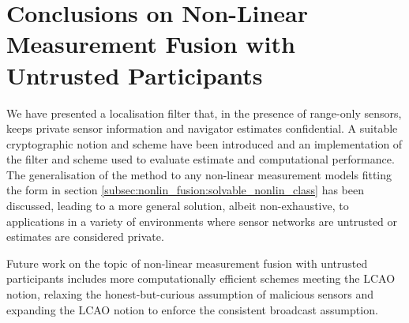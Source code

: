 % 
%                                               
%                                               
%                                               
% 

\section{Conclusions on Non-Linear Measurement Fusion with Untrusted Participants}\label{sec:nonlin_fusion:conclusion}
We have presented a localisation filter that, in the presence of range-only sensors, keeps private sensor information and navigator estimates confidential. A suitable cryptographic notion and scheme have been introduced and an implementation of the filter and scheme used to evaluate estimate and computational performance. The generalisation of the method to any non-linear measurement models fitting the form in section \ref{subsec:nonlin_fusion:solvable_nonlin_class} has been discussed, leading to a more general solution, albeit non-exhaustive, to applications in a variety of environments where sensor networks are untrusted or estimates are considered private.

Future work on the topic of non-linear measurement fusion with untrusted participants includes more computationally efficient schemes meeting the LCAO notion, relaxing the honest-but-curious assumption of malicious sensors and expanding the LCAO notion to enforce the consistent broadcast assumption.